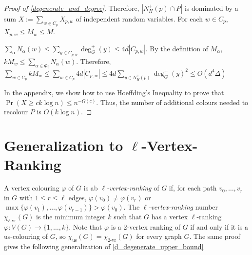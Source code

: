 \documentclass{patmorin}
\newcommand{\defin}[1]{\emph{\color{brightmaroon}#1}}
\newcommand{\rn}[1]{\chi_{\operatorname{#1-vr}}}
\newcommand{\trn}{\chi_{\mathrm{us}}}
\newcommand{\lrn}{\rn{\ell}}
\begin{document}
\begin{proof}[Proof of \cref{degenerate_and_degree}]
  Therefore, $|N^+_H(p)\cap P|$ is dominated by a sum $X:=\sum_{w\in C_p} X_{p,w}$ of independent random variables.  For each $w\in C_p$, $X_{p,w}\le M_w\le M$.




  $\sum_{\alpha} N_{\alpha}(w)\le \sum_{y\in C_{p,w}}\deg_G^+(y)\le 4d|C_{p,w}|$.  By the definition of $M_\alpha$, $kM_w \le \sum_{\alpha\in\Phi_i} N_\alpha(w)$.  Therefore, $\sum_{w\in C_p}kM_w\le \sum_{w\in C_p} 4d|C_{p,w}|\le 4d\sum_{y\in N^+_H(p)}\deg_G^+(y)^2\le O(d^4\Delta)$







    In the appendix, we show how to use Hoeffding's Inequality to prove that $\Pr(X\ge ck\log n)\le n^{-\Omega(c)}$.  Thus, the number of additional colours needed to recolour $P$ is $O(k\log n)$.
\end{proof}

\section{Generalization to $\ell$-Vertex-Ranking}

A vertex colouring $\varphi$ of $G$ is ab \defin{$\ell$-vertex-ranking} of $G$ if, for each path $v_0,\ldots,v_r$ in $G$ with $1\le r\le\ell$ edges, $\varphi(v_0)\neq \varphi(v_r)$ or $\max\{\varphi(v_1),\ldots,\varphi(v_{r-1})\}>\varphi(v_0)$.  The \defin{$\ell$-vertex-ranking} number $\lrn(G)$ is the minimum integer $k$ such that $G$ has a vertex $\ell$-ranking $\varphi:V(G)\to\{1,\ldots,k\}$.  Note that $\varphi$ is a $2$-vertex ranking of $G$ if and only if it is a us-colouring of $G$, so $\trn(G)=\rn{2}(G)$ for every graph $G$.  The same proof gives the following generalization of \cref{d_degenerate_upper_bound}
\end{document}
